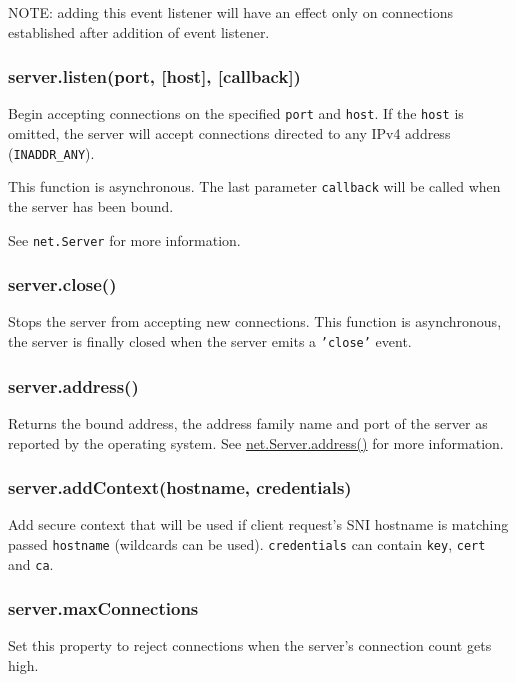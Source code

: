 NOTE: adding this event listener will have an effect only on connections
established after addition of event listener.

\subsubsection{server.listen(port, {[}host{]}, {[}callback{]})}

Begin accepting connections on the specified \texttt{port} and
\texttt{host}. If the \texttt{host} is omitted, the server will accept
connections directed to any IPv4 address (\texttt{INADDR\_ANY}).

This function is asynchronous. The last parameter \texttt{callback} will
be called when the server has been bound.

See \texttt{net.Server} for more information.

\subsubsection{server.close()}

Stops the server from accepting new connections. This function is
asynchronous, the server is finally closed when the server emits a
\texttt{'close'} event.

\subsubsection{server.address()}

Returns the bound address, the address family name and port of the
server as reported by the operating system. See
\href{net.html\#net\_server\_address}{net.Server.address()} for more
information.

\subsubsection{server.addContext(hostname, credentials)}

Add secure context that will be used if client request's SNI hostname is
matching passed \texttt{hostname} (wildcards can be used).
\texttt{credentials} can contain \texttt{key}, \texttt{cert} and
\texttt{ca}.

\subsubsection{server.maxConnections}

Set this property to reject connections when the server's connection
count gets high.

